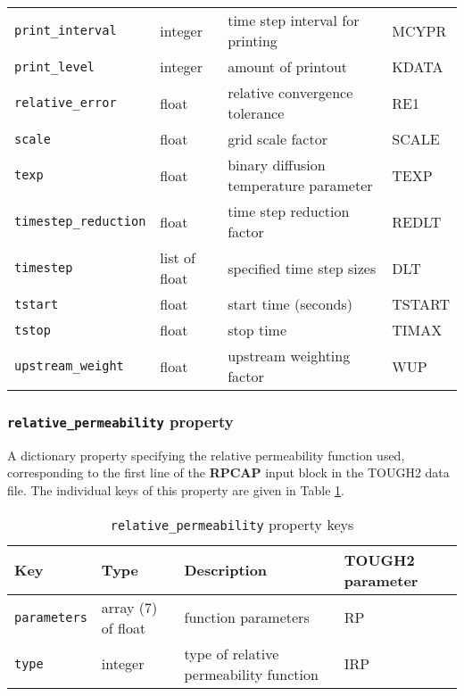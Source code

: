 \begin{sidewaystable}
\begin{center}
\begin{tabular}{|l|l|l|l|}
      \texttt{print\_interval} & integer & time step interval for printing & MCYPR\\
      \texttt{print\_level} & integer & amount of printout & KDATA\\
      \texttt{relative\_error} & float & relative convergence tolerance & RE1\\
      \texttt{scale} & float & grid scale factor & SCALE\\
      \texttt{texp} & float & binary diffusion temperature parameter & TEXP\\
      \texttt{timestep\_reduction} & float & time step reduction factor & REDLT\\
      \texttt{timestep} & list of float & specified time step sizes & DLT\\
      \texttt{tstart} & float & start time (seconds) & TSTART\\
      \texttt{tstop} & float & stop time & TIMAX\\
      \texttt{upstream\_weight} & float & upstream weighting factor & WUP\\
      \hline
    \end{tabular}
    \caption{\texttt{parameter} property keys}
    \label{tb:parameter}
  \end{center}
\end{sidewaystable}

\subsubsection{\texttt{relative\_permeability} property}

A dictionary property specifying the relative permeability function used, corresponding to the first line of the \textbf{RPCAP} input block in the TOUGH2 data file.  The individual keys of this property are given in Table \ref{tb:relativepermeability}.

\begin{table}
  \begin{center}
    \begin{tabular}{|l|l|l|p{20mm}|}
      \hline
      \textbf{Key} & \textbf{Type} & \textbf{Description} & \textbf{TOUGH2 parameter}\\
      \hline
      \texttt{parameters} & array (7) of float & function parameters & RP\\
      \texttt{type} & integer & type of relative permeability function & IRP\\
      \hline
    \end{tabular}
    \caption{\texttt{relative\_permeability} property keys}
    \label{tb:relativepermeability}
  \end{center}
\end{table}

